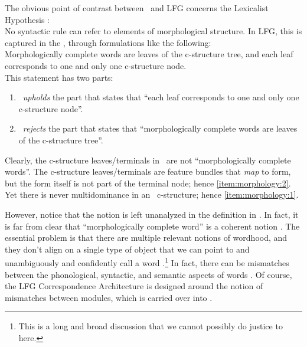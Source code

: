 \documentclass[output=paper,hidelinks]{langscibook}
\begin{document}
The obvious point of contrast between \lrfg\ and LFG concerns
the Lexicalist Hypothesis \citep{chomsky1970remarks,lapointe80}:  
%
\ea
{}\\
  No syntactic rule can refer to elements of morphological
  structure. \hfill \citep[8]{lapointe80}
\z
%
In LFG, this is captured in the , through formulations like the following:
%
\ea \label{ex:lip} \\
    Morphologically complete words are leaves of the c-structure tree,
    and each leaf corresponds to one and only one c-structure
    node.\label{lipa} \\ \mbox{\citep[92]{BresnanEtAl2016}}
  \z
  This statement has two parts:
  \begin{enumerate}
  \item \label{item:morphology:1} \lrfg\ \emph{upholds} the part that states that ``each leaf
    corresponds to one and only one c-structure node''.

  \item \label{item:morphology:2} \lrfg\ \emph{rejects} the part that states that
    ``morphologically complete words are leaves of the c-structure
    tree''.
  \end{enumerate}
  Clearly, the c-structure leaves/terminals in \lrfg\ are not
  ``morphologically complete words''. The c-structure leaves/terminals
  are feature bundles that \emph{map} to form, but the form itself is
  not part of the terminal node; hence \ref{item:morphology:2}. Yet there is never multidominance in
  an \lrfg\ c-structure; hence \ref{item:morphology:1}.

  However, notice that the notion 
  is left unanalyzed in the definition in .  In fact, it is
  far from clear that ``morphologically complete word'' is a coherent
  notion \citep[for discussion, see e.g.,][]{anderson82-wm}. The essential
  problem is that there are multiple relevant notions of wordhood, and
  they don't align on a single type of object that we can point to and
  unambiguously and confidently call a word
  \citep{disciullo:word}.\footnote{This is a long and broad
    discussion that we cannot possibly do justice to here.} In fact,
  there can be mismatches between the phonological, syntactic, and
  semantic aspects of words \citep{marantz1997no}. Of course, the LFG
  Correspondence Architecture is designed around the notion of
  mismatches between modules, which is carried over into \lrfg. 
\end{document}
